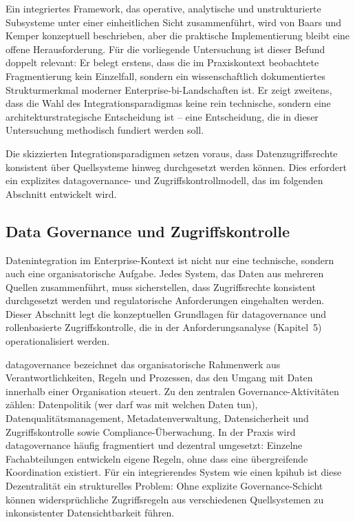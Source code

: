 Ein integriertes Framework, das operative, analytische und unstrukturierte Subsysteme unter einer einheitlichen Sicht zusammenführt, wird von Baars und Kemper konzeptuell beschrieben, aber die praktische Implementierung bleibt eine offene Herausforderung.
Für die vorliegende Untersuchung ist dieser Befund doppelt relevant: Er belegt erstens, dass die im Praxiskontext beobachtete Fragmentierung kein Einzelfall, sondern ein wissenschaftlich dokumentiertes Strukturmerkmal moderner Enterprise-\gls{bi}-Landschaften ist.
Er zeigt zweitens, dass die Wahl des Integrationsparadigmas keine rein technische, sondern eine architekturstrategische Entscheidung ist -- eine Entscheidung, die in dieser Untersuchung methodisch fundiert werden soll.

Die skizzierten Integrationsparadigmen setzen voraus, dass Datenzugriffsrechte konsistent über Quellsysteme hinweg durchgesetzt werden können.
Dies erfordert ein explizites \gls{datagovernance}- und Zugriffskontrollmodell, das im folgenden Abschnitt entwickelt wird.


\subsection{Data Governance und Zugriffskontrolle}
\label{sec:grundlagen-governance}

Datenintegration im Enterprise-Kontext ist nicht nur eine technische, sondern auch eine organisatorische Aufgabe.
Jedes System, das Daten aus mehreren Quellen zusammenführt, muss sicherstellen, dass Zugriffsrechte konsistent durchgesetzt werden und regulatorische Anforderungen eingehalten werden.
Dieser Abschnitt legt die konzeptuellen Grundlagen für \gls{datagovernance} und rollenbasierte Zugriffskontrolle, die in der Anforderungsanalyse (Kapitel~5) operationalisiert werden.

\gls{datagovernance} bezeichnet das organisatorische Rahmenwerk aus Verantwortlichkeiten, Regeln und Prozessen, das den Umgang mit Daten innerhalb einer Organisation steuert.
Zu den zentralen Governance-Aktivitäten zählen: Datenpolitik (wer darf was mit welchen Daten tun), Datenqualitätsmanagement, Metadatenverwaltung, Datensicherheit und Zugriffskontrolle sowie Compliance-Überwachung.
In der Praxis wird \gls{datagovernance} häufig fragmentiert und dezentral umgesetzt: Einzelne Fachabteilungen entwickeln eigene Regeln, ohne dass eine übergreifende Koordination existiert.
Für ein integrierendes System wie einen \gls{kpihub} ist diese Dezentralität ein strukturelles Problem: Ohne explizite Governance-Schicht können widersprüchliche Zugriffsregeln aus verschiedenen Quellsystemen zu inkonsistenter Datensichtbarkeit führen.

